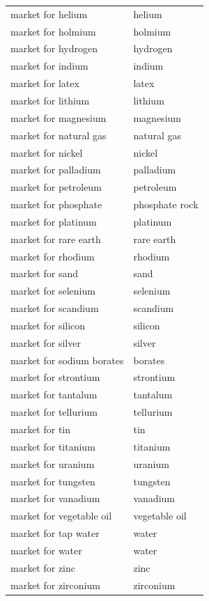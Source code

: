 \documentclass{article}
\begin{document}
\begin{longtable}{ll}
market for helium & helium \\
market for holmium & holmium \\
market for hydrogen & hydrogen \\
market for indium & indium \\
market for latex & latex \\
market for lithium & lithium \\
market for magnesium & magnesium \\
market for natural gas & natural gas \\
market for nickel & nickel \\
market for palladium & palladium \\
market for petroleum & petroleum \\
market for phosphate & phosphate rock \\
market for platinum & platinum \\
market for rare earth & rare earth \\
market for rhodium & rhodium \\
market for sand & sand \\
market for selenium & selenium \\
market for scandium & scandium \\
market for silicon & silicon \\
market for silver & silver \\
market for sodium borates & borates \\
market for strontium & strontium \\
market for tantalum & tantalum \\
market for tellurium & tellurium \\
market for tin & tin \\
market for titanium & titanium \\
market for uranium & uranium \\
market for tungsten & tungsten \\
market for vanadium & vanadium \\
market for vegetable oil & vegetable oil \\
market for tap water & water \\
market for water & water \\
market for zinc & zinc \\
market for zirconium & zirconium \\
\bottomrule
\end{longtable}
\end{document}

